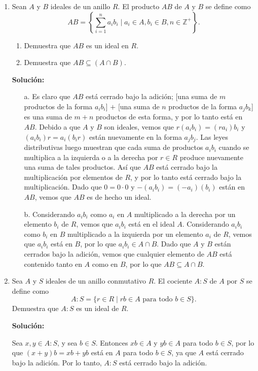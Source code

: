 \begin{enumerate}
    \item Sean $A$ y $B$ ideales de un anillo $R$. El producto $AB$ de $A$ y $B$ se define como
    \[
    AB = \left\{\sum_{i=1}^{n} a_ib_i \mid a_i \in A, b_i \in B, n \in \mathbb{Z}^+\right\}.
    \]
    \begin{enumerate}
        \item Demuestra que $AB$ es un ideal en $R$.
        \item Demuestra que $AB \subseteq (A \cap B)$.
    \end{enumerate}
    \textbf{Solución:}
    \begin{enumerate}
    \item[a.] Es claro que $AB$ está cerrado bajo la adición; [una suma de $m$ productos de la forma $a_i b_i$] $+$ [una suma de $n$ productos de la forma $a_j b_k$] es una suma de $m + n$ productos de esta forma, y por lo tanto está en $AB$. Debido a que $A$ y $B$ son ideales, vemos que $r(a_i b_i) = (ra_i) b_i$ y $(a_i b_i)r = a_i (b_i r)$ están nuevamente en la forma $a_j b_j$. Las leyes distributivas luego muestran que cada suma de productos $a_i b_i$ cuando se multiplica a la izquierda o a la derecha por $r \in R$ produce nuevamente una suma de tales productos. Así que $AB$ está cerrado bajo la multiplicación por elementos de $R$, y por lo tanto está cerrado bajo la multiplicación. Dado que $0 = 0 \cdot 0$ y $-(a_i b_i) = (-a_i)(b_i)$ están en $AB$, vemos que $AB$ es de hecho un ideal.
    \item[b.] Considerando $a_i b_i$ como $a_i$ en $A$ multiplicado a la derecha por un elemento $b_i$ de $R$, vemos que $a_i b_i$ está en el ideal $A$. Considerando $a_i b_i$ como $b_i$ en $B$ multiplicado a la izquierda por un elemento $a_i$ de $R$, vemos que $a_i b_i$ está en $B$, por lo que $a_i b_i \in A \cap B$. Dado que $A$ y $B$ están cerrados bajo la adición, vemos que cualquier elemento de $AB$ está contenido tanto en $A$ como en $B$, por lo que $AB \subseteq A \cap B$.
    \end{enumerate}
    \item  Sea $A$ y $S$ ideales de un anillo conmutativo $R$. El cociente $A : S$ de $A$ por $S$ se define como
    \[
    A : S = \{r \in R \mid rb \in A \text{ para todo } b \in S\}.
    \]
    Demuestra que $A : S$ es un ideal de $R$.

    \textbf{Solución:}

    Sea $x, y \in A : S$, y sea $b \in S$. Entonces $xb \in A$ y $yb \in A$ para todo $b \in S$, por lo que $(x + y)b = xb + yb$ está en $A$ para todo $b \in S$, ya que $A$ está cerrado bajo la adición. Por lo tanto, $A : S$ está cerrado bajo la adición.


\end{enumerate}
